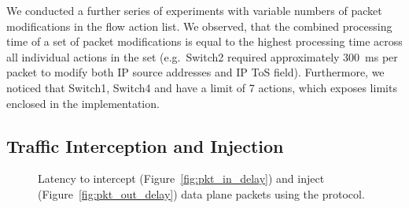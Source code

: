 We conducted a further series of experiments with variable numbers of packet
modifications in the flow action list. We observed, that the combined processing
time of a set of packet modifications is equal to the highest processing time
across all individual actions in the set (e.g.~Switch2 required approximately
300~ms per packet to modify both IP source addresses and IP ToS field).
Furthermore, we noticed that Switch1, Switch4 and \ovs have a limit of 7
actions, which exposes limits enclosed in the implementation.

\subsection{Traffic Interception and Injection}\label{sec:results-pktin}

\begin{figure}[t]
  \begin{center}
  \end{center}
  \caption[\texttt{pkt\_in} and \texttt{pkt\_out} processing latency]{Latency to
    intercept (Figure~\ref{fig:pkt_in_delay}) and inject
    (Figure~\ref{fig:pkt_out_delay}) data plane packets using the \of protocol.}
  \label{fig:pkt_in_out_delay}
\end{figure}


